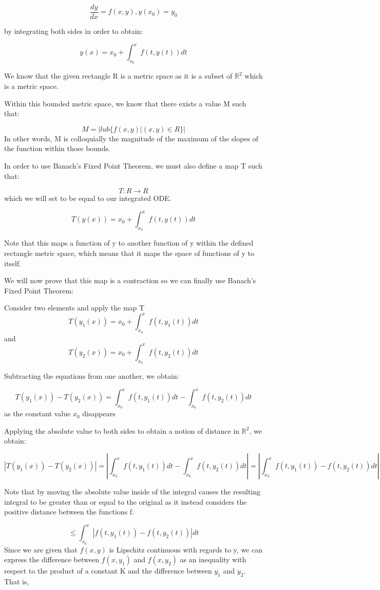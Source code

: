 \documentclass{article}
\begin{document}
$$\frac{dy}{dx} = f(x,y), y(x_0) = y_0$$

by integrating both sides in order to obtain:

$$ y(x) = x_0 + \int_{x_0}^{x}f(t,y(t))dt$$


We know that the given rectangle R is a metric space as it is a subset of $\mathbb{R}^2$ which is a metric space. 

Within this bounded metric space, we know that there exists a value M such that: 

$$M = |lub \{f(x,y) | (x,y) \in R\}|$$
In other words, M is colloquially the magnitude of the maximum of the slopes of the function within those bounds.

In order to use Banach's Fixed Point Theorem, we must also define a map T such that:

$$ T: R \to R$$
which we will set to be equal to our integrated ODE.

$$ T(y(x)) =  x_0 + \int_{x_0}^{x}f(t,y(t))dt$$

Note that this maps a function of y to another function of y within the defined rectangle metric space, which means that it maps the space of functions of y to itself.

We will now prove that this map is a contraction so we can finally use Banach's Fixed Point Theorem:

Consider two elements and apply the map T
$$T(y_1(x)) =  x_0 + \int_{x_0}^{x}f(t,y_1(t))dt$$
and
$$T(y_2(x)) =  x_0 + \int_{x_0}^{x}f(t,y_2(t))dt$$

Subtracting the equations from one another, we obtain:

$$T(y_1(x))- T(y_2(x)) = \int_{x_0}^{x}f(t,y_1(t))dt - \int_{x_0}^{x}f(t,y_2(t))dt$$
as the constant value $x_0$ disappears

Applying the absolute value to both sides to obtain a notion of distance in $\mathbb{R}^2$, we obtain:

$$|T(y_1(x))- T(y_2(x))| = |\int_{x_0}^{x}f(t,y_1(t))dt - \int_{x_0}^{x}f(t,y_2(t))dt|  = |\int_{x_0}^{x}f(t,y_1(t)) - f(t,y_2(t))dt|$$

Note that by moving the absolute value inside of the integral causes the resulting integral to be greater than or equal to the original as it instead considers the positive distance between the functions f.

$$ \leq \int_{x_0}^{x}|f(t,y_1(t)) - f(t,y_2(t))|dt$$
Since we are given that $f(x,y)$ is Lipschitz continuous with regards to y, we can express the difference between $f(x,y_1)$ and $f(x,y_2)$ as an inequality with respect to the product of a constant K and the difference between $y_1$ and $y_2$. That is,
\end{document}
